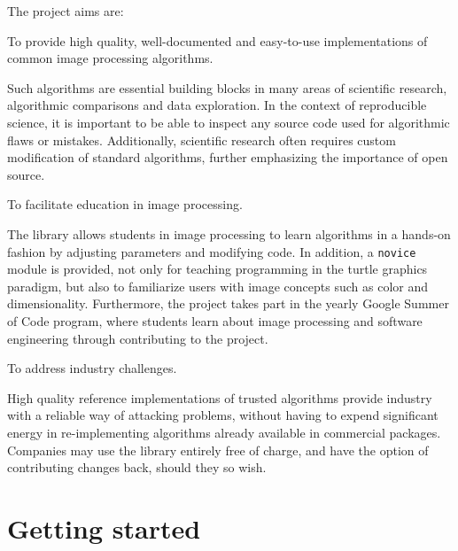 \documentclass[fleqn,12pt]{wlpeerj}
\begin{document}
The project aims are:
\begin{list}{.}
{
\setlength{\rightmargin}{\leftmargin}
}

\item 

To provide high quality, well-documented and easy-to-use
implementations of common image processing algorithms.

Such algorithms are essential building blocks in many areas of scientific
research, algorithmic comparisons and data exploration. In the
context of reproducible science, it is important to be able to inspect any
source code used for algorithmic flaws or mistakes. Additionally, scientific
research often requires custom modification of standard algorithms, further
emphasizing the importance of open source.
\item 

To facilitate education in image processing.

The library allows students in image processing to learn algorithms in a
hands-on fashion by adjusting parameters and modifying code. In addition, a
\texttt{novice} module is provided, not only for teaching programming in the
\textquotedbl{}turtle graphics\textquotedbl{} paradigm, but also to familiarize users with image
concepts such as color and dimensionality. Furthermore, the project
takes part in the yearly Google Summer of Code \cite{gsoc} program, where
students learn about image processing and software engineering through
contributing to the project.
\item 

To address industry challenges.

High quality reference implementations of trusted algorithms provide
industry with a reliable way of attacking problems, without having to expend
significant energy in re-implementing algorithms already available in
commercial packages.  Companies may use the library entirely free of charge,
and have the option of contributing changes back, should they so wish.\end{list}


\section*{Getting started}
  \label{getting-started}
\end{document}
